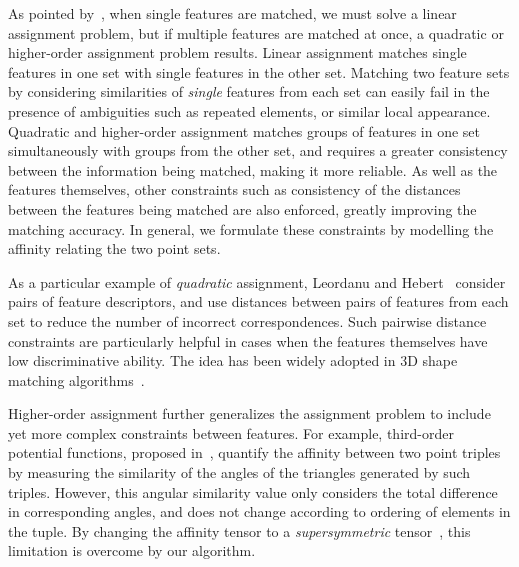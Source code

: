 As pointed by~\cite{Conte04}, when single features are matched,
we must solve a linear assignment problem, but if multiple features are matched at once,
a quadratic or higher-order assignment problem results.
Linear assignment matches single features in one set with single features in the other set.
Matching two feature sets by considering similarities of \emph{single} features from each set can easily fail in the presence of ambiguities such as repeated elements,
or similar local appearance.
Quadratic and higher-order assignment matches groups of features in one set simultaneously with groups from the other set,
and requires a greater consistency between the information being matched, making it more reliable.
As well as the features themselves, other constraints such as consistency of the distances between the features being matched are also enforced,
greatly improving the matching accuracy.
In general, we formulate these constraints by modelling the affinity relating the two point sets.

As a particular example of \emph{quadratic} assignment, Leordanu and Hebert~\cite{Leordeanu05} consider pairs of feature descriptors,
and use distances between pairs of features from each set to reduce the number of incorrect correspondences.
Such pairwise distance constraints are particularly helpful in cases when the features themselves have low discriminative ability.
The idea has been widely adopted in 3D shape matching algorithms~\cite{Tevs09,Ovsjanikov10,Tevs11,Kim11,SahilliogluY11,Windheuser11}.

Higher-order assignment further generalizes the assignment problem to include yet more complex constraints between features.
For example, third-order potential functions, proposed in~\cite{Duchenne09,Zeng10,Chertok10},
quantify the affinity between two point triples by measuring the similarity of the angles of the triangles generated by such triples.
However, this angular similarity value only considers the total difference in corresponding angles, and does not change according to ordering of elements in the tuple.
By changing the affinity tensor to a \emph{supersymmetric} tensor~\cite{Kofidis02}, this limitation is overcome by our algorithm.


